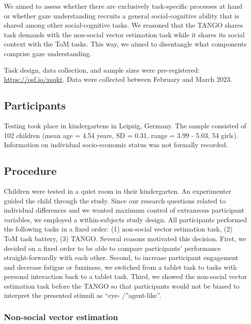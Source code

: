 \documentclass[
  man,mask,floatsintext]{apa6}
\begin{document}
We aimed to assess whether there are exclusively task-specific processes at hand or whether gaze understanding recruits a general social-cognitive ability that is shared among other social-cognitive tasks. We reasoned that the TANGO shares task demands with the non-social vector estimation task while it shares its social context with the ToM tasks. This way, we aimed to disentangle what components comprise gaze understanding.

Task design, data collection, and sample sizes were pre-registered: \url{https://osf.io/xsqkt}. Data were collected between February and March 2023.

\hypertarget{participants-2}{%
\subsection{Participants}\label{participants-2}}

Testing took place in kindergartens in Leipzig, Germany. The sample consisted of 102 children (mean age = 4.54 years, SD = 0.31, range = 3.99 - 5.03, 54 girls). Information on individual socio-economic status was not formally recorded.

\hypertarget{procedure-2}{%
\subsection{Procedure}\label{procedure-2}}

Children were tested in a quiet room in their kindergarten. An experimenter guided the child through the study. Since our research questions related to individual differences and we wanted maximum control of extraneous participant variables, we employed a within-subjects study design. All participants performed the following tasks in a fixed order: (1) non-social vector estimation task, (2) ToM task battery, (3) TANGO. Several reasons motivated this decision. First, we decided on a fixed order to be able to compare participants' performance straight-forwardly with each other. Second, to increase participant engagement and decrease fatigue or fuzziness, we switched from a tablet task to tasks with personal interaction back to a tablet task. Third, we showed the non-social vector estimation task before the TANGO so that participants would not be biased to interpret the presented stimuli as ``eye- /''agent-like''.

\hypertarget{non-social-vector-estimation}{%
\subsubsection{Non-social vector estimation}\label{non-social-vector-estimation}}
\end{document}
